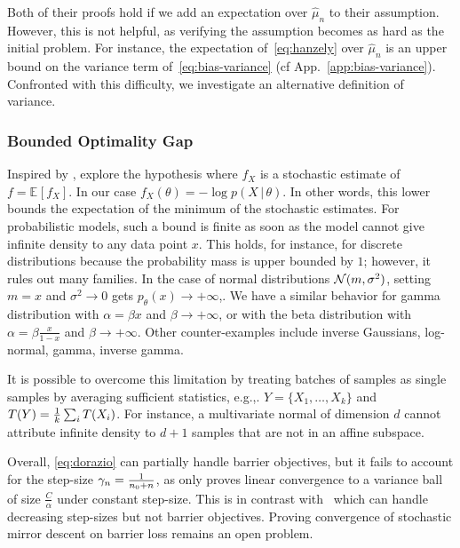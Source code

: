 \documentclass[twoside]{article}
\newcommand*{\expect}[2][]{\ensuremath{\mathbb{E}_{#1} \left[ #2 \right] }} %
\newcommand*{\expecti}[2][]{\ensuremath{\mathbb{E}_{#1} [ #2 ] }} %
\newcommand{\cond}{\,\vert\,}
\newcommand{\nat}{\theta}
\newcommand{\m}{\mu}
\newcommand{\lr}{\gamma} %
\newcommand{\MAPm}{\hat \m_n}
\newcommand{\stgcvx}{\alpha} %
\begin{document}
Both of their proofs hold if we add an expectation over $\MAPm$ to their assumption.
However, this is not helpful, as verifying the assumption becomes as hard as the initial problem.
For instance, the expectation of~\eqref{eq:hanzely} over $\MAPm$ is an upper bound on the variance term of~\eqref{eq:bias-variance} (cf App.~\ref{app:bias-variance}).
Confronted with this difficulty, we investigate an alternative definition of variance.

\subsubsection{Bounded Optimality Gap}
Inspired by \citet{loizou2021stochastic}, \citet{dorazio2021stochastic} explore the hypothesis
\alignn{
	\min_\nat f(\nat) - \expect[X]{\min_\nat f_X(\nat)} \leq C,
	\label{eq:dorazio}
}
where $f_X$ is a stochastic estimate of $f = \expecti{f_X}$. In our case $f_X(\nat) = - \log p(X\cond \nat)$.
In other words, this lower bounds the expectation of the minimum of the stochastic estimates.
For probabilistic models, such a bound is finite as soon as the model cannot give infinite density to any data point $x$.
This holds, for instance, for discrete distributions because the probability mass is upper bounded by $1$; however, it rules out many families.
In the case of normal distributions ${\mathcal N}(m, \sigma^2)$, setting $m=x$ and $\sigma^2 \rightarrow 0$ gets $p_\nat (x) \rightarrow +\infty$,.
We have a similar behavior for gamma distribution with $\alpha = \beta x$ and $\beta \rightarrow +\infty$, or with the beta distribution with $\alpha=\beta \frac{x}{1-x}$ and $\beta \rightarrow +\infty$.
Other counter-examples include inverse Gaussians, log-normal, gamma, inverse gamma.

It is possible to overcome this limitation by treating batches of samples as single samples by averaging sufficient statistics, e.g.,. $Y = \{X_1, \dots, X_k\}$ and $T(Y) = \frac{1}{k}\sum_i T(X_i)$.
For instance, a multivariate normal of dimension $d$ cannot attribute infinite density to $d+1$ samples that are not in an affine subspace.

Overall, \eqref{eq:dorazio} can partially handle barrier objectives, but it fails to account for the step-size $\lr_n = \inv{n_0+n}$, as \citet[Thm.1]{dorazio2021stochastic} only proves linear convergence to a variance ball of size $\frac{C}{\stgcvx}$ under constant step-size.
This is in contrast with~\citet{dragomir2021fast} which can handle decreasing step-sizes but not barrier objectives.
Proving convergence of stochastic mirror descent on barrier loss remains an open problem.
\end{document}
